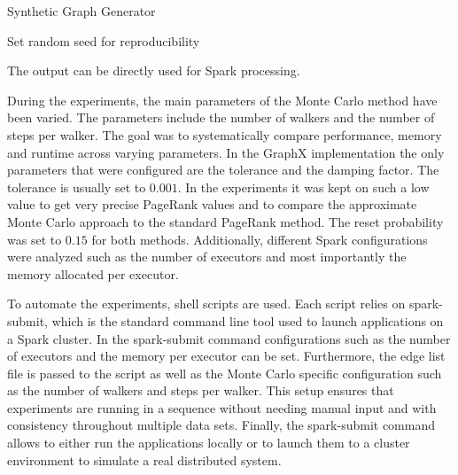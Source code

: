 \vspace{1.5em}
\begin{algorithm}[H]
\caption{Synthetic Graph Generator}

Set random seed for reproducibility\;
\end{algorithm} 
\vspace{1.5em}

The output can be directly used for Spark processing.\par
During the experiments, the main parameters of the Monte Carlo method have been varied. The parameters include the number of walkers and the number of steps per walker. The goal was to systematically compare performance, memory and runtime across varying parameters. In the GraphX implementation the only parameters that were configured are the tolerance and the damping factor. The tolerance is usually set to $0.001$. In the experiments it was kept on such a low value to get very precise PageRank values and to compare the approximate Monte Carlo approach to the standard PageRank method. The reset probability was set to $0.15$ for both methods. Additionally, different Spark configurations were analyzed such as the number of executors and most importantly the memory allocated per executor. \par



To automate the experiments, shell scripts are used. Each script relies on spark-submit, which is the standard command line tool used to launch applications on a Spark cluster. In the spark-submit command configurations such as the number of executors and the memory per executor can be set. Furthermore, the edge list file is passed to the script as well as the Monte Carlo specific configuration such as the number of walkers and steps per walker. This setup ensures that experiments are running in a sequence without needing manual input and with consistency throughout multiple data sets. Finally, the spark-submit command allows to either run the applications locally or to launch them to a cluster environment to simulate a real distributed system. \par

